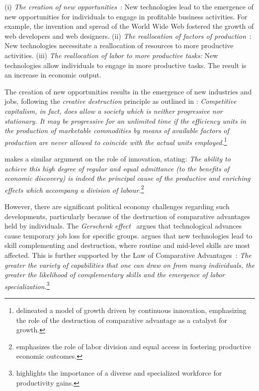 \documentclass{article} %
\begin{document}
    (i) \emph{The creation of new opportunities}~\citep{mokyr1992lever, autor2003skill}:
    New technologies lead to the emergence of new opportunities for individuals to engage in profitable business activities.
    For example, the invention and spread of the World Wide Web fostered the growth of web developers and web designers.
    (ii) \emph{The reallocation of factors of production}~\citep{autor2003skill, autor2015there, restrepo2023automation}:
    New technologies necessitate a reallocation of resources to more productive activities.
    (iii) \emph{The reallocation of labor to more productive tasks:} New technologies allow individuals to engage in more productive tasks. The result is an increase in economic output.


The creation of new opportunities results in the emergence of new industries and jobs, following the \emph{creative destruction} principle as outlined in \citet{aghion1990model, schumpeter2013capitalism, autor2003skill, autor2015there}:   \emph{Competitive capitalism, in fact, does allow a society which is neither progressive nor stationary. It may be progressive for an unlimited time if the efficiency units in the production of marketable commodities by means of available factors of production are never allowed to coincide with the actual units employed.}\footnote{\citet{aghion1990model} delineated a model of growth driven by continuous innovation, emphasizing the role of the destruction of comparative advantage as a catalyst for growth.}

\citet{smith2002inquiry} makes a similar argument on the role of innovation, stating:   \emph{The ability to achieve this high degree of regular and equal admittance (to the benefits of economic discovery) is indeed the principal cause of the productive and enriching effects which accompany a division of labour.}\footnote{\citet{smith2002inquiry} emphasizes the role of labor division and equal access in fostering productive economic outcomes.}

However, there are significant political economy challenges regarding such developments, particularly because of the destruction of comparative advantages held by individuals.
The \emph{Gerschenk effect}~\citep{autor2003skill} argues that technological advances cause temporary job loss for specific groups. 
\citet{Friedman1957ConsistencyOT} argues that new technologies lead to skill complementing and destruction, where routine and mid-level skills are most affected.
This is further supported by the Law of Comparative Advantages~\citep{smith2002inquiry}:     \emph{The greater the variety of capabilities that one can draw on from many individuals, the greater the likelihood of complementary skills and the emergence of labor specialization.}\footnote{\citet{smith2002inquiry} highlights the importance of a diverse and specialized workforce for productivity gains.}
\end{document}
